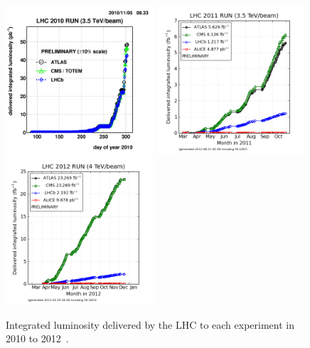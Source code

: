 \begin{figure}[htb]
\centering
\includegraphics[width=0.49\textwidth]{Experiment/2010_lhc_luminocity.png}
\includegraphics[width=0.49\textwidth]{Experiment/2011_lhc_luminocity.png}
\includegraphics[width=0.49\textwidth]{Experiment/2012_lhc_luminocity.png}
\caption{Integrated luminosity delivered by the LHC to each experiment in 2010 to 2012~\cite{lhc_lumi_plots}.}
\label{fig:lhc_luminocity}
\end{figure}






